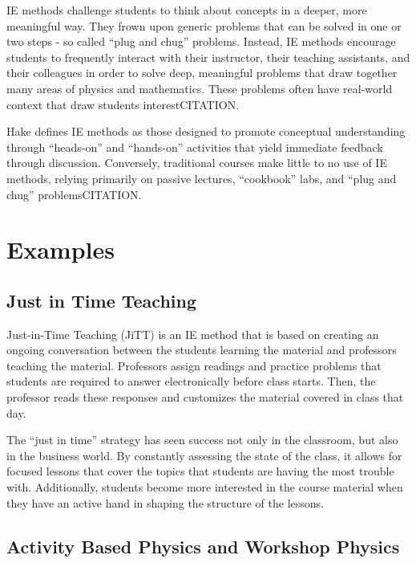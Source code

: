 IE methods challenge students to think about concepts in a deeper, more meaningful way. They frown upon generic problems that can be solved in one or two steps - so called ``plug and chug'' problems. Instead, IE methods encourage students to frequently interact with their instructor, their teaching assistants, and their colleagues in order to solve deep, meaningful problems that draw together many areas of physics and mathematics. These problems often have real-world context that draw students interestCITATION.

Hake defines IE methods as those designed to promote conceptual understanding through ``heads-on'' and ``hands-on'' activities that yield immediate feedback through discussion. Conversely, traditional courses make little to no use of IE methods, relying primarily on passive lectures, ``cookbook'' labs, and ``plug and chug'' problemsCITATION.

\section{Examples}

\subsection{Just in Time Teaching}

Just-in-Time Teaching (JiTT) is an IE method that is based on creating an ongoing conversation between the students learning the material and professors teaching the material. Professors assign readings and practice problems that students are required to answer electronically before class starts. Then, the professor reads these responses and customizes the material covered in class that day\cite{novak1999}.

The ``just in time'' strategy has seen success not only in the classroom, but also in the business world. By constantly assessing the state of the class, it allows for focused lessons that cover the topics that students are having the most trouble with. Additionally, students become more interested in the course material when they have an active hand in shaping the structure of the lessons.

\subsection{Activity Based Physics and Workshop Physics}

